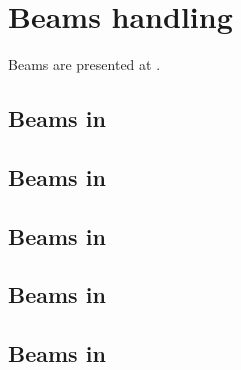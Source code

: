 



\chapter{Beams handling}

Beams are presented at .


\section{Beams in \mxsrToMsr{}}


\section{Beams in \mxsrToMsr{}}


\section{Beams in \msrToMsr{}}


\section{Beams in \msrToLpsr{}}


\section{Beams in \lpsrToLilypond{}}


